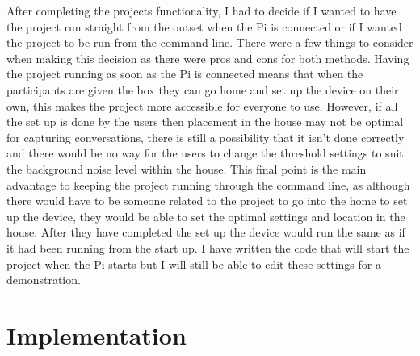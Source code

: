 \documentclass[a4paper,11pt]{report}
\begin{document}
After completing the projects functionality, I had to decide if I wanted to have the project run straight from the outset when the Pi is connected or if I wanted the project to be run from the command line. There were a few things to consider when making this decision as there were pros and cons for both methods. Having the project running as soon as the Pi is connected means that when the participants are given the box they can go home and set up the device on their own, this makes the project more accessible for everyone to use. However, if all the set up is done by the users then placement in the house may not be optimal for capturing conversations, there is still a possibility that it isn’t done correctly and there would be no way for the users to change the threshold settings to suit the background noise level within the house. This final point is the main advantage to keeping the project running through the command line, as although there would have to be someone related to the project to go into the home to set up the device, they would be able to set the optimal settings and location in the house. After they have completed the set up the device would run the same as if it had been running from the start up. I have written the code that will start the project when the Pi starts but I will still be able to edit these settings for a demonstration.

\section{Implementation}
\end{document}
